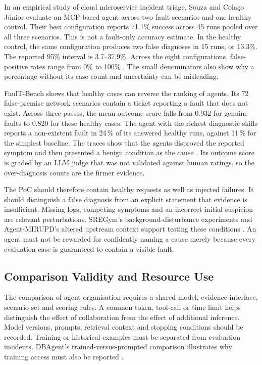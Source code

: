 In an empirical study of cloud microservice incident triage, Souza and
Cola\c{c}o J\'unior evaluate an MCP-based agent across two fault scenarios
and one healthy control. Their best configuration reports
71.1\% success across 45 runs pooled over all three scenarios. This is
not a fault-only accuracy estimate. In the healthy control, the same
configuration produces two false diagnoses in 15 runs, or 13.3\%. The
reported 95\% interval is 3.7--37.9\%. Across the eight configurations,
false-positive rates range from 0\% to 100\%
\parencite[Tables~4--5]{souza2026cloudmicroservices}.
The small denominators also show why a percentage without its case count
and uncertainty can be misleading.

FaulT-Bench shows that healthy cases can reverse the ranking of agents.
Its 72 false-premise network scenarios contain a ticket reporting a fault
that does not exist. Across three passes, the mean outcome score falls
from 0.932 for genuine faults to 0.820 for these healthy cases. The agent
with the richest diagnostic skills reports a non-existent fault in 24\,\%
of its answered healthy runs, against 11\,\% for the simplest baseline.
The traces show that the agents disproved the reported symptom and then
presented a benign condition as the cause
\parencite[Section~5.2, Tables~4 and~6]{tseng2026faultbench}. Its outcome
score is graded by an LLM judge that was not validated against human
ratings, so the over-diagnosis counts are the firmer evidence.

The PoC should therefore contain healthy requests as well as injected
failures. It should distinguish a false diagnosis from an explicit statement
that evidence is insufficient. Missing logs, competing symptoms and an
incorrect initial suspicion are relevant perturbations. SREGym's
background-disturbance experiments and Agent-MIRUPD's altered upstream
context support testing these conditions
\parencite{clark2026sregym,rasouli2026agentmirupd}.
An agent must not be rewarded for confidently naming a cause merely because
every evaluation case is guaranteed to contain a visible fault.

\subsection{Comparison Validity and Resource Use}

The comparison of agent organisation requires a shared model, evidence
interface, scenario set and scoring rules. A common token, tool-call or
time limit helps distinguish the effect of collaboration from the effect
of additional inference. Model versions, prompts, retrieval context and
stopping conditions should be recorded. Training or historical examples
must be separated from evaluation incidents. DBAgent's trained-versus-prompted
comparison illustrates why training access must also be reported
\parencite{chen2026dbagent}.

